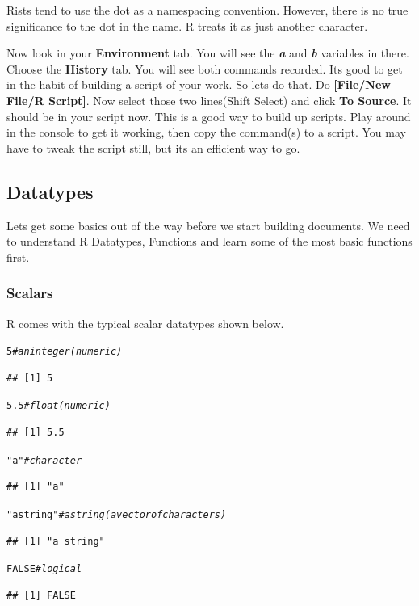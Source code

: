 \documentclass{article}\usepackage[]{graphicx}\usepackage[]{color}
\makeatletter
\newcommand{\hlnum}[1]{\textcolor[rgb]{0.686,0.059,0.569}{#1}}%
\newcommand{\hlstr}[1]{\textcolor[rgb]{0.192,0.494,0.8}{#1}}%
\newcommand{\hlcom}[1]{\textcolor[rgb]{0.678,0.584,0.686}{\textit{#1}}}%
\newenvironment{kframe}{%
 \def\at@end@of@kframe{}%
 \ifinner\ifhmode%
  \def\at@end@of@kframe{\end{minipage}}%
  \begin{minipage}{\columnwidth}%
 \fi\fi%
 \def\FrameCommand##1{\hskip\@totalleftmargin \hskip-\fboxsep
 \colorbox{shadecolor}{##1}\hskip-\fboxsep
     \hskip-\linewidth \hskip-\@totalleftmargin \hskip\columnwidth}%
 \MakeFramed {\advance\hsize-\width
   \@totalleftmargin\z@ \linewidth\hsize
   \@setminipage}}%
 {\par\unskip\endMakeFramed%
 \at@end@of@kframe}
\newenvironment{knitrout}{}{} %
\makeatother
\begin{document}
    Rists tend to use the dot as a namespacing convention. However, there is no true significance to the dot in the name. R treats it as just another character.
    
    Now look in your \textbf{Environment} tab. You will see the \textbf{\textit{a}} and \textbf{\textit{b}} variables in there. Choose the \textbf{History} tab. You will see both commands recorded. Its good to get in the habit of building a script of your work. So lets do that. Do \textbf{[File/New File/R Script]}. Now select those two lines(Shift Select) and click \textbf{To Source}. It should be in your script now. This is a good way to build up scripts. Play around in the console to get it working, then copy the command(s) to a script. You may have to tweak the script still, but its an efficient way to go.
    
  \subsection*{Datatypes}
    
    Lets get some basics out of the way before we start building documents. We need to understand R Datatypes, Functions and learn some of the most basic functions first.
    
    \subsubsection*{Scalars}
    R comes with the typical scalar datatypes shown below.
    
\begin{knitrout}
\color{fgcolor}\begin{kframe}
\begin{alltt}
  \hlnum{5} \hlcom{# an integer (numeric)}
\end{alltt}
\begin{verbatim}
## [1] 5
\end{verbatim}
\begin{alltt}
  \hlnum{5.5} \hlcom{# float (numeric)}
\end{alltt}
\begin{verbatim}
## [1] 5.5
\end{verbatim}
\begin{alltt}
  \hlstr{"a"} \hlcom{#character}
\end{alltt}
\begin{verbatim}
## [1] "a"
\end{verbatim}
\begin{alltt}
  \hlstr{"a string"}  \hlcom{# a string (a vector of characters)}
\end{alltt}
\begin{verbatim}
## [1] "a string"
\end{verbatim}
\begin{alltt}
  \hlnum{FALSE} \hlcom{# logical}
\end{alltt}
\begin{verbatim}
## [1] FALSE
\end{verbatim}
\end{kframe}
\end{knitrout}
    
\end{document}
